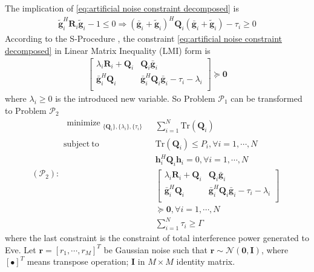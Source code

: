 \documentclass[conference]{IEEEtran}
\begin{document}

The implication of \eqref{eq:artificial noise constraint decomposed} is
\begin{eqnarray}
\tilde{\mathbf{g}}_i^H\mathbf{R}_i\tilde{\mathbf{g}} _i - 1\leq 0  \Rightarrow (\bar{\mathbf{g}}_i+\tilde{\mathbf{g}}_i)^H\mathbf{Q}_i(\bar{\mathbf{g}}_i+\tilde{\mathbf{g}}_i) - \tau_i \geq 0
\end{eqnarray}
According to the S-Procedure \cite{ConvexOpt_Boyd}, the constraint \eqref{eq:artificial noise constraint decomposed}  in Linear Matrix Inequality (LMI) form is
\begin{eqnarray}
\left[ {\begin{array}{cc}
	\lambda_i\mathbf{R}_i+\mathbf{Q}_i  & \mathbf{Q}_i\bar{\mathbf{g}}_i \\
	\bar{\mathbf{g}}_i^H\mathbf{Q}_i& \bar{\mathbf{g}}_i^H\mathbf{Q}_i\bar{\mathbf{g}} _i- \tau_i -\lambda_i\\
	\end{array} } \right] \succeq \mathbf{0}
\end{eqnarray}
where $\lambda_i \geq 0$ is the introduced new variable. So Problem $\mathcal{P}_1$ can be transformed to Problem $\mathcal{P}_2$
\begin{equation}\label{eq:problem2}
(\mathcal{P}_{2}): \begin{array}{ll}
\begin{split}
\mathop{\text{minimize}}_{\substack{\{\mathbf{Q}_{i}\}, \{\lambda_i\},\{\tau_i\}}} 
\end{split}  
& \sum_{i=1}^N\mathrm{Tr}(\mathbf{Q}_i)\\
\mathrm{subject~to} &\mathrm{Tr}(\mathbf{Q}_i) \leq P_i, \forall i = 1, \cdots, N\\
& \mathbf{h}_i^H\mathbf{Q}_i\mathbf{h}_i= 0,\forall i = 1, \cdots, N\\
&\left[ {\begin{array}{cc}
	\lambda_i\mathbf{R}_i+\mathbf{Q}_i  & \mathbf{Q}_i\bar{\mathbf{g}}_i \\
	\bar{\mathbf{g}}_i^H\mathbf{Q}_i & \bar{\mathbf{g}}_i^H\mathbf{Q}_i\bar{\mathbf{g}}_i - \tau_i -\lambda_i\\
	\end{array} } \right] \\
&\succeq \mathbf{0},\forall i = 1, \cdots, N\\
&\sum_{i=1}^N \tau_i \geq \Gamma
\end{array}
\end{equation}
where the last constraint is the constraint of total interference power generated to Eve. Let $\mathbf{r} = [r_1,\cdots,r_M]^T$ be Gaussian noise such that $\mathbf{r} \sim \mathcal{N}(\mathbf{0},\mathbf{I})$, where $[\bullet]^T$ means transpose operation; $\mathbf{I}$ in $M \times M$ identity matrix. 
\end{document}
